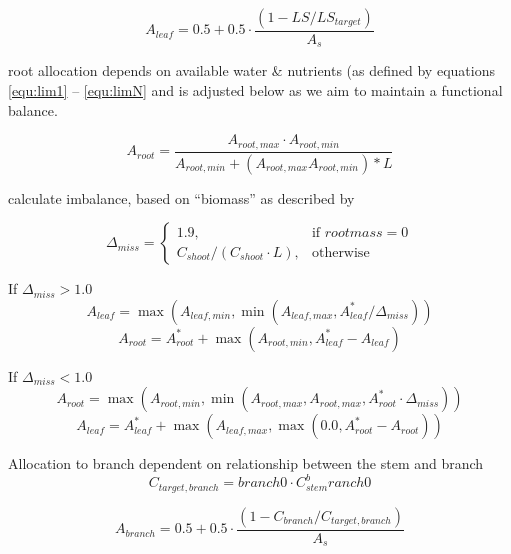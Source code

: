 \begin{equation}
	A_{leaf} = 0.5 + 0.5 \cdot \dfrac{(1-LS/LS_{target})}{A_{s}}
	\label{AleafAllometric}
\end{equation}

root allocation depends on available water \& nutrients (as defined by equations \ref{equ:lim1} -- \ref{equ:limN} and is adjusted below as we aim to maintain a functional balance.

\begin{equation}
	A_{root} = \dfrac{A_{root,max} \cdot A_{root,min}}{A_{root,min} + (A_{root,max} A_{root,min})*L}
\end{equation}

calculate imbalance, based on ``biomass'' as described by \citet{sitch2003}

\begin{equation}
	\Delta_{miss}=
	\begin{cases}
	    1.9,& \text{if } root mass = 0 \\
	    C_{shoot}/(C_{shoot} \cdot L),& \text{otherwise}
	\end{cases}
\end{equation}

If $\Delta_{miss} > 1.0$ 
\begin{equation}
	A_{leaf} = \max (A_{leaf,min}, \min (A_{leaf,max}, A_{leaf}^* / \Delta_{miss}))
\end{equation}
\begin{equation}
	A_{root} = A_{root}^* + \max (A_{root,min}, A_{leaf}^* - A_{leaf})
\end{equation}

If $\Delta_{miss} < 1.0$ 
\begin{equation}
	A_{root} = \max (A_{root,min}, \min (A_{root,max},A_{root,max}, A_{root}^* \cdot \Delta_{miss}))
\end{equation}
\begin{equation}
	A_{leaf} = A_{leaf}^* + \max (A_{leaf,max}, \max(0.0, A_{root}^* - A_{root}))
\end{equation}


Allocation to branch dependent on relationship between the stem and branch
\begin{equation}
	C_{target,branch} = branch0 \cdot C_{stem}^branch0
\end{equation}

\begin{equation}
	A_{branch} = 0.5 + 0.5 \cdot \dfrac{(1-C_{branch}/C_{target,branch})}{A_{s}}
\end{equation}

